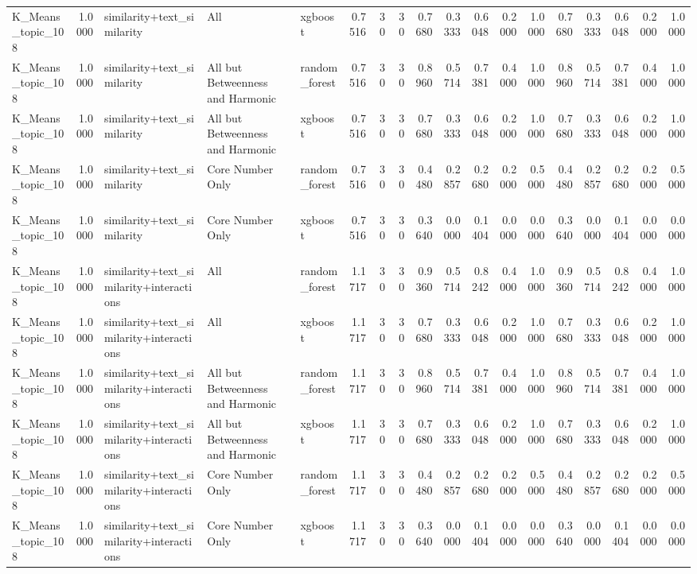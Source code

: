 \begin{tabular}{lrlllrrrrrrrrrrrrr}
K_Means_topic_108 & 1.0000 & similarity+text_similarity & All & xgboost & 0.7516 & 30 & 30 & 0.7680 & 0.3333 & 0.6048 & 0.2000 & 1.0000 & 0.7680 & 0.3333 & 0.6048 & 0.2000 & 1.0000 \\
K_Means_topic_108 & 1.0000 & similarity+text_similarity & All but Betweenness and Harmonic & random_forest & 0.7516 & 30 & 30 & 0.8960 & 0.5714 & 0.7381 & 0.4000 & 1.0000 & 0.8960 & 0.5714 & 0.7381 & 0.4000 & 1.0000 \\
K_Means_topic_108 & 1.0000 & similarity+text_similarity & All but Betweenness and Harmonic & xgboost & 0.7516 & 30 & 30 & 0.7680 & 0.3333 & 0.6048 & 0.2000 & 1.0000 & 0.7680 & 0.3333 & 0.6048 & 0.2000 & 1.0000 \\
K_Means_topic_108 & 1.0000 & similarity+text_similarity & Core Number Only & random_forest & 0.7516 & 30 & 30 & 0.4480 & 0.2857 & 0.2680 & 0.2000 & 0.5000 & 0.4480 & 0.2857 & 0.2680 & 0.2000 & 0.5000 \\
K_Means_topic_108 & 1.0000 & similarity+text_similarity & Core Number Only & xgboost & 0.7516 & 30 & 30 & 0.3640 & 0.0000 & 0.1404 & 0.0000 & 0.0000 & 0.3640 & 0.0000 & 0.1404 & 0.0000 & 0.0000 \\
K_Means_topic_108 & 1.0000 & similarity+text_similarity+interactions & All & random_forest & 1.1717 & 30 & 30 & 0.9360 & 0.5714 & 0.8242 & 0.4000 & 1.0000 & 0.9360 & 0.5714 & 0.8242 & 0.4000 & 1.0000 \\
K_Means_topic_108 & 1.0000 & similarity+text_similarity+interactions & All & xgboost & 1.1717 & 30 & 30 & 0.7680 & 0.3333 & 0.6048 & 0.2000 & 1.0000 & 0.7680 & 0.3333 & 0.6048 & 0.2000 & 1.0000 \\
K_Means_topic_108 & 1.0000 & similarity+text_similarity+interactions & All but Betweenness and Harmonic & random_forest & 1.1717 & 30 & 30 & 0.8960 & 0.5714 & 0.7381 & 0.4000 & 1.0000 & 0.8960 & 0.5714 & 0.7381 & 0.4000 & 1.0000 \\
K_Means_topic_108 & 1.0000 & similarity+text_similarity+interactions & All but Betweenness and Harmonic & xgboost & 1.1717 & 30 & 30 & 0.7680 & 0.3333 & 0.6048 & 0.2000 & 1.0000 & 0.7680 & 0.3333 & 0.6048 & 0.2000 & 1.0000 \\
K_Means_topic_108 & 1.0000 & similarity+text_similarity+interactions & Core Number Only & random_forest & 1.1717 & 30 & 30 & 0.4480 & 0.2857 & 0.2680 & 0.2000 & 0.5000 & 0.4480 & 0.2857 & 0.2680 & 0.2000 & 0.5000 \\
K_Means_topic_108 & 1.0000 & similarity+text_similarity+interactions & Core Number Only & xgboost & 1.1717 & 30 & 30 & 0.3640 & 0.0000 & 0.1404 & 0.0000 & 0.0000 & 0.3640 & 0.0000 & 0.1404 & 0.0000 & 0.0000 \\

\end{tabular}
